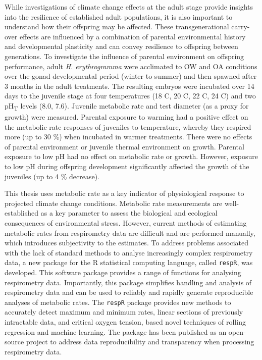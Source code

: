 \documentclass[
  oneside, 11pt, a4paper]{memoir}
\begin{document}
While investigations of climate change effects at the adult stage provide insights into the resilience of established adult populations, it is also important to understand how their offspring may be affected.
These transgenerational carry-over effects are influenced by a combination of parental environmental history and developmental plasticity and can convey resilience to offspring between generations.
To investigate the influence of parental environment on offspring performance, adult \textit{H. erythrogramma} were acclimated to OW and OA conditions over the gonad developmental period (winter to summer) and then spawned after 3 months in the adult treatments.
The resulting embryos were incubated over 14 days to the juvenile stage at four temperatures (18 \degree C, 20 \degree C, 22 \degree C, 24 \degree C) and two pH\textsubscript{T} levels (8.0, 7.6).
Juvenile metabolic rate and test diameter (as a proxy for growth) were measured.
Parental exposure to warming had a positive effect on the metabolic rate responses of juveniles to temperature, whereby they respired more (up to 30 \%) when incubated in warmer treatments.
There were no effects of parental environment or juvenile thermal environment on growth.
Parental exposure to low pH had no effect on metabolic rate or growth. 
However, exposure to low pH during offspring development significantly affected the growth of the juveniles (up to 4 \% decrease).

This thesis uses metabolic rate as a key indicator of physiological response to projected climate change conditions.
Metabolic rate measurements are well-established as a key parameter to assess the biological and ecological consequences of environmental stress. 
However, current methods of estimating metabolic rates from respirometry data are difficult and are performed manually, which introduces subjectivity to the estimates.
To address problems associated with the lack of standard methods to analyse increasingly complex respirometry data, a new package for the R statistical computing language, called \texttt{respR}, was developed.
This software package provides a range of functions for analysing respirometry data.
Importantly, this package simplifies handling and analysis of respirometry data and can be used to reliably and rapidly generate reproducible analyses of metabolic rates.
The \texttt{respR} package provides new methods to accurately detect maximum and minimum rates, linear sections of previously intractable data, and critical oxygen tension, based novel techniques of rolling regression and machine learning.
The package has been published as an open-source project to address data reproducibility and transparency when processing respirometry data.
\end{document}
